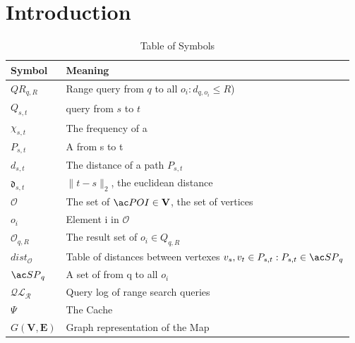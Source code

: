 \section{Introduction} \label{sec:intro}


\begin{table}
\begin{tabular*}{\columnwidth}{|l|p{}|}
\hline
\bf Symbol		& \bf Meaning \\\hline
$QR_{q,R}$		& Range query from $q$ to all $o_i : d_{q,o_i} \leq R$) \\\hline
$Q_{s,t}$		& \spath query from $s$ to $t$ \\\hline
$\chi_{s,t}$		& The frequency of a \spath \\\hline
$P_{s,t}$		& A \spath from s to t \\\hline
$d_{s,t}$		& The \spath distance of a path $P_{s,t}$ \\\hline
$\mathfrak{d}_{s,t}$	& $\| t - s \|_2$, the euclidean distance \\\hline
$\mathcal{O}$		& The set of $\poi \in \mathbf{V}$, the set of vertices\\\hline
$o_i$			& Element i in $\mathcal{O}$ \\\hline
$\mathcal{O}_{q,R}$	& The result set of  $o_i \in Q_{q,R}$ \\\hline
$dist_{\mathcal{O}}$	& Table of distances between vertexes $v_s, v_t \in P_{s,t} :  P_{s,t} \in \spath_q$ \\\hline
$\spath_{q}$		& A set of \spath from q to all $o_i$ \\\hline

$\mathcal{QL_R}$	& Query log of range search queries \\\hline
$\Psi$ 			& The Cache \\\hline
$G\mathbf{(V,E)}$ 	& Graph representation of the Map \\\hline 
\end{tabular*}
\caption{Table of Symbols}
\label{tab:symbols}
\end{table}

